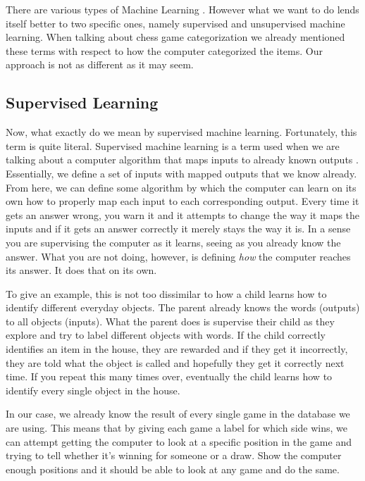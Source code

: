 \documentclass[12pt]{article}
\begin{document}
    There are various types of Machine Learning \cite{mltypes_book}. However what we want to do lends itself better to two specific ones, namely supervised and unsupervised machine learning. When talking about chess game categorization we already mentioned these terms with respect to how the computer categorized the items. Our approach is not as different as it may seem.

    \subsection{Supervised Learning}

    Now, what exactly do we mean by supervised machine learning. Fortunately, this term is quite literal. Supervised machine learning is a term used when we are talking about a computer algorithm that maps inputs to already known outputs \cite{mltypes_book}. Essentially, we define a set of inputs with mapped outputs that we know already. From here, we can define some algorithm by which the computer can learn on its own how to properly map each input to each corresponding output. Every time it gets an answer wrong, you warn it and it attempts to change the way it maps the inputs and if it gets an answer correctly it merely stays the way it is. In a sense you are supervising the computer as it learns, seeing as you already know the answer. What you are not doing, however, is defining \textit{how} the computer reaches its answer. It does that on its own.
    
    To give an example, this is not too dissimilar to how a child learns how to identify different everyday objects. The parent already knows the words (outputs) to all objects (inputs). What the parent does is supervise their child as they explore and try to label different objects with words. If the child correctly identifies an item in the house, they are rewarded and if they get it incorrectly, they are told what the object is called and hopefully they get it correctly next time. If you repeat this many times over, eventually the child learns how to identify every single object in the house. 

    In our case, we already know the result of every single game in the database we are using. This means that by giving each game a label for which side wins, we can attempt getting the computer to look at a specific position in the game and trying to tell whether it's winning for someone or a draw. Show the computer enough positions and it should be able to look at any game and do the same.
\end{document}
